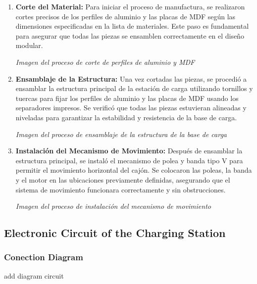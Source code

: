     \begin{enumerate}
        \item \textbf{Corte del Material:} Para iniciar el proceso de manufactura, se realizaron cortes precisos de los perfiles de aluminio y las placas de MDF según las dimensiones especificadas en la lista de materiales. Este paso es fundamental para asegurar que todas las piezas se ensamblen correctamente en el diseño modular.
            \begin{center}
                \textit{Imagen del proceso de corte de perfiles de aluminio y MDF}
            \end{center}
        \item \textbf{Ensamblaje de la Estructura:} Una vez cortadas las piezas, se procedió a ensamblar la estructura principal de la estación de carga utilizando tornillos y tuercas para fijar los perfiles de aluminio y las placas de MDF usando los separadores impresos. Se verificó que todas las piezas estuvieran alineadas y niveladas para garantizar la estabilidad y resistencia de la base de carga.
            \begin{center}
                \textit{Imagen del proceso de ensamblaje de la estructura de la base de carga}
            \end{center}
        \item \textbf{Instalación del Mecanismo de Movimiento:} Después de ensamblar la estructura principal, se instaló el mecanismo de polea y banda tipo V para permitir el movimiento horizontal del cajón. Se colocaron las poleas, la banda y el motor en las ubicaciones previamente definidas, asegurando que el sistema de movimiento funcionara correctamente y sin obstrucciones.
            \begin{center}
                \textit{Imagen del proceso de instalación del mecanismo de movimiento}
            \end{center}
        
    \end{enumerate}



    \subsection{Electronic Circuit of the Charging Station}

    \subsubsection{Conection Diagram}
    add diagram circuit
    
